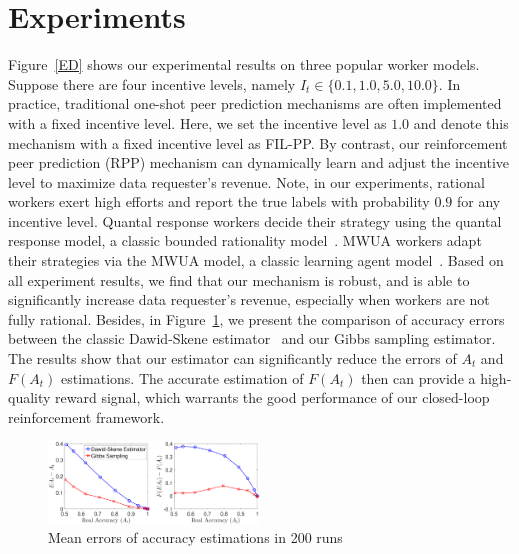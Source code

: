 \documentclass[letterpaper]{article} %
\begin{document}
\section{Experiments}
Figure~\ref{ED} 
shows our experimental results on three popular worker models.
Suppose there are four incentive levels, namely $I_t\in \{0.1, 1.0, 5.0, 10.0\}$.
In practice, traditional one-shot peer prediction mechanisms are often implemented with a fixed incentive level.
Here, we set the incentive level as $1.0$ and denote this mechanism with a fixed incentive level as FIL-PP.
By contrast, our reinforcement peer prediction (RPP) mechanism can dynamically learn and adjust the incentive level to maximize data requester's revenue.
Note, in our experiments, rational workers exert  high efforts and report the true labels with probability $0.9$ for any incentive level.
Quantal response workers decide their strategy using the quantal response model, a classic bounded rationality model~\cite{mckelvey1995quantal}.
MWUA workers adapt their strategies via the MWUA model, a classic learning agent model~\cite{chastain2014algorithms}.
Based on all experiment results, we find that our mechanism is robust, and is able to significantly increase data requester's revenue, especially when workers are not fully rational.
Besides, in Figure~\ref{ED2}, we present the comparison of accuracy errors between the classic Dawid-Skene estimator~\cite{dawid1979maximum} and our Gibbs sampling estimator.
The results show that our estimator can significantly reduce the errors of $A_t$ and $F(A_t)$ estimations.
The accurate estimation of $F(A_t)$ then can provide a high-quality reward signal, which warrants the good performance of our closed-loop reinforcement framework.
\begin{figure}[htb]
    \centering
     \includegraphics[width=0.5\textwidth]{image/4}
    \caption{\label{ED2} Mean errors of accuracy estimations in 200 runs}
\end{figure}



\end{document}

